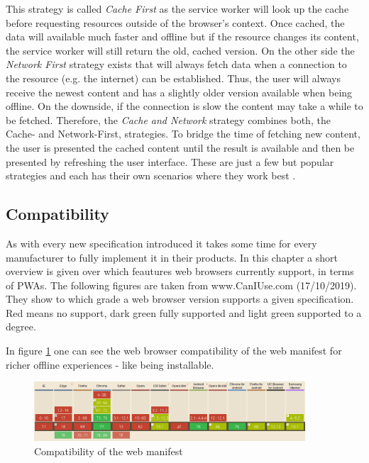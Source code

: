 This strategy is called \textit{Cache First} as the service worker will look up the cache before requesting resources outside of the browser’s context. Once cached, the data will available much faster and offline but if the resource changes its content, the service worker will still return the old, cached version. On the other side the \textit{Network First} strategy exists that will always fetch data when a connection to the resource (e.g. the internet) can be established. Thus, the user will always receive the newest content and has a slightly older version available when being offline. On the downside, if the connection is slow the content may take a while to be fetched. Therefore, the \textit{Cache and Network} strategy combines both, the Cache- and Network-First, strategies. To bridge the time of fetching new content, the user is presented the cached content until the result is available and then be presented by refreshing the user interface. These are just a few but popular strategies and each has their own scenarios where they work best \cite[pp. 109-111]{hajianProgressiveWebApps2019}.

\subsection{Compatibility}
\label{sec:theorieCd}


As with every new specification introduced it takes some time for every manufacturer to fully implement it in their products. In this chapter a short overview is given over which feautures web browsers currently support, in terms of  \acs{PWA}s. The following figures are taken from www.CanIUse.com (17/10/2019). They show to which grade a web browser version supports a given specification. Red means no support, dark green fully supported and light green supported to a degree.

In figure \ref{fig:pwacompatibilitywebmanifest} one can see the web browser compatibility of the web manifest for richer offline experiences - like being installable.

\begin{figure}[htbp] 
	\centering
	\includegraphics[width=0.9\textwidth]{Assets/chapter_pwa/webmanifestsupport.PNG}
	\caption{Compatibility of the web manifest}
	\label{fig:pwacompatibilitywebmanifest}
\end{figure}


